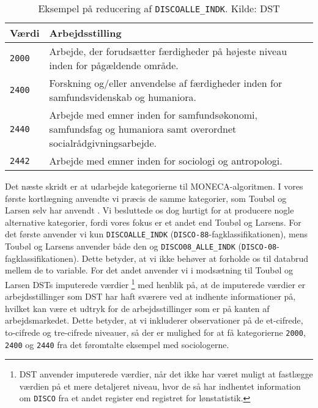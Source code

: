 % 
\begin{table}[H] \centering
\caption{Eksempel på reducering af \texttt{DISCOALLE\_INDK}. Kilde: DST}
\label{tab_reducering}
\begin{tabular}{@{} l m{11cm} @{}} \toprule
Værdi  & Arbejdsstilling \\ \midrule
  \texttt{2000} & Arbejde, der forudsætter færdigheder på højeste niveau inden for pågældende område. \\ 
  \texttt{2400} & Forskning og/eller anvendelse af færdigheder inden for samfundsvidenskab og humaniora. \\ 
  \texttt{2440} & Arbejde med emner inden for samfundsøkonomi, samfundsfag og humaniora samt overordnet socialrådgivningsarbejde. \\ 
  \texttt{2442} & Arbejde med emner inden for sociologi og antropologi. \\ \bottomrule
\end{tabular} \end{table}
%
Det næste skridt er at udarbejde kategorierne til MONECA-algoritmen. I vores første kortlægning anvendte vi præcis de samme kategorier, som Toubøl og Larsen selv har anvendt \parencite{TouboelLarsen2015}. Vi besluttede os dog hurtigt for at producere nogle alternative kategorier, fordi vores fokus er et andet end Toubøl og Larsens. For det første anvender vi kun \texttt{DISCOALLE\_INDK} (\texttt{DISCO-88}-fagklassifikationen), mens Toubøl og Larsens anvender både den og \texttt{DISCO08\_ALLE\_INDK} (\texttt{DISCO-08}-fagklassifikationen). Dette betyder, at vi ikke behøver at forholde os til databrud mellem de to variable. For det andet anvender vi i modsætning til Toubøl og Larsen DSTs imputerede værdier \footnote{DST anvender imputerede værdier, når det ikke har været muligt at fastlægge værdien på et mere detaljeret niveau, hvor de så har indhentet information om \texttt{DISCO} fra et andet register end registret for lønstatistik.} med henblik på, at de imputerede værdier er arbejdsstillinger som DST har haft sværere ved at indhente informationer på, hvilket kan være et udtryk for de arbejdsstillinger som er på kanten af arbejdsmarkedet. Dette betyder, at vi inkluderer observationer på de et-cifrede, to-cifrede og tre-cifrede niveauer, så der er mulighed for at få kategorierne \texttt{2000}, \texttt{2400} og \texttt{2440} fra det føromtalte eksempel med sociologerne.

